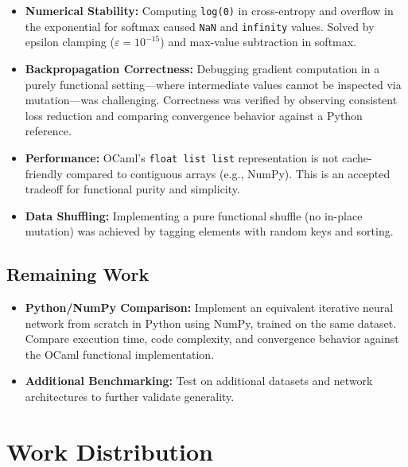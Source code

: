 \documentclass[12pt, a4paper]{article}
\begin{document}
\begin{itemize}[leftmargin=1.5cm]
    \item \textbf{Numerical Stability:} Computing \texttt{log(0)} in cross-entropy and overflow in the exponential for softmax caused \texttt{NaN} and \texttt{infinity} values. Solved by epsilon clamping ($\varepsilon = 10^{-15}$) and max-value subtraction in softmax.
    
    \item \textbf{Backpropagation Correctness:} Debugging gradient computation in a purely functional setting---where intermediate values cannot be inspected via mutation---was challenging. Correctness was verified by observing consistent loss reduction and comparing convergence behavior against a Python reference.
    
    \item \textbf{Performance:} OCaml's \texttt{float list list} representation is not cache-friendly compared to contiguous arrays (e.g., NumPy). This is an accepted tradeoff for functional purity and simplicity.
    
    \item \textbf{Data Shuffling:} Implementing a pure functional shuffle (no in-place mutation) was achieved by tagging elements with random keys and sorting.
\end{itemize}

\subsection{Remaining Work}

\begin{itemize}[leftmargin=1.5cm]
    \item \textbf{Python/NumPy Comparison:} Implement an equivalent iterative neural network from scratch in Python using NumPy, trained on the same dataset. Compare execution time, code complexity, and convergence behavior against the OCaml functional implementation.
    \item \textbf{Additional Benchmarking:} Test on additional datasets and network architectures to further validate generality.
\end{itemize}

\section{Work Distribution}
\end{document}
